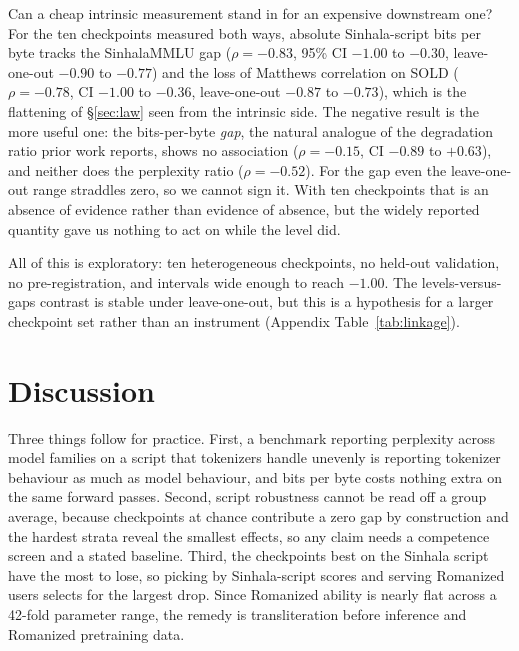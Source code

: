 \documentclass[11pt]{article}
\begin{document}
Can a cheap intrinsic measurement stand in for an expensive downstream one? For the
ten checkpoints measured both ways, absolute Sinhala-script bits per byte tracks the
SinhalaMMLU gap ($\rho = -0.83$, 95\% CI $-1.00$ to $-0.30$, leave-one-out $-0.90$
to $-0.77$) and the loss of Matthews correlation on SOLD ($\rho = -0.78$, CI
$-1.00$ to $-0.36$, leave-one-out $-0.87$ to $-0.73$), which is the flattening of
\S\ref{sec:law} seen from the intrinsic side. The negative result is the more
useful one: the bits-per-byte
\emph{gap}, the natural analogue of the degradation ratio prior work reports, shows
no association ($\rho = -0.15$, CI $-0.89$ to $+0.63$), and neither does the
perplexity ratio ($\rho = -0.52$). For the gap even the leave-one-out range
straddles zero, so we cannot sign it. With ten checkpoints that is an absence of
evidence rather than evidence of absence, but the widely reported quantity gave us
nothing to act on while the level did.

All of this is exploratory: ten heterogeneous checkpoints, no held-out validation, no
pre-registration, and intervals wide enough to reach $-1.00$. The levels-versus-gaps
contrast is stable under leave-one-out, but this is a hypothesis for a larger
checkpoint set rather than an instrument (Appendix Table~\ref{tab:linkage}).

\section{Discussion}
\label{sec:discussion}

Three things follow for practice. First, a benchmark reporting perplexity across
model families on a script that tokenizers handle unevenly is reporting tokenizer
behaviour as much as model behaviour, and bits per byte costs nothing extra on the
same forward passes. Second, script robustness cannot be read off a group average,
because checkpoints at chance contribute a zero gap by construction and the hardest
strata reveal the smallest effects, so any claim needs a competence screen and a
stated baseline. Third, the checkpoints best on the Sinhala script have the most to
lose, so picking by Sinhala-script scores and serving Romanized users selects for the
largest drop. Since Romanized ability is nearly flat across a 42-fold parameter
range, the remedy is transliteration before inference and Romanized pretraining
data.


\label{sec:endofmain}
\end{document}

